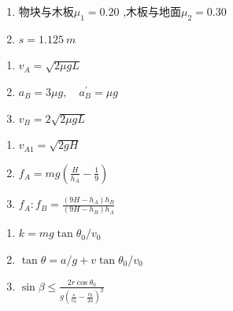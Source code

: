 \item \begin {enumerate} \renewcommand {\labelenumi }{\arabic {enumi}.} \item 物块与木板$ \mu _{1}=0.20 $ ,木板与地面$ \mu _{2}=0.30 $ \item $ s=1.125\ m $ \par \par \end {enumerate} \par \par 
\item \begin {enumerate} \renewcommand {\labelenumi }{\arabic {enumi}.} \item $v _ { A } = \sqrt { 2 \mu g L }$ \item $a _ { B } = 3 \mu g , \quad a _ { B } ^ { \prime } = \mu g$ \item $v _ { B } = 2 \sqrt { 2 \mu g L }$ \par \par \end {enumerate} \par \par 
\item \begin {enumerate} \renewcommand {\labelenumi }{\arabic {enumi}.} \item $v _ { A 1 } = \sqrt { 2 g H }$ \item $f _ { A } = m g \left ( \frac { H } { h _ { A } } - \frac { 1 } { 9 } \right )$ \item $f _ { A }: f _ { B } = \frac { \left ( 9 H - h _ { A } \right ) h _ { B } } { \left ( 9 H - h _ { B } \right ) h _ { A } }$ \par \end {enumerate} \par \par 
\item \begin {enumerate} \renewcommand {\labelenumi }{\arabic {enumi}.} \item $k = m g \tan \theta _ { 0 } / v _ { 0 }$ \item $\tan \theta = a / g + v \tan \theta _ { 0 } / v _ { 0 }$ \item $\sin \beta \leq \frac { 2 r \cos \theta _ { 0 } } { g \left ( \frac { s } { v _ { 0 } } - \frac { v _ { 0 } } { 2 a } \right ) ^ { 2 } }$ \par \par \par \end {enumerate} \par \par 
